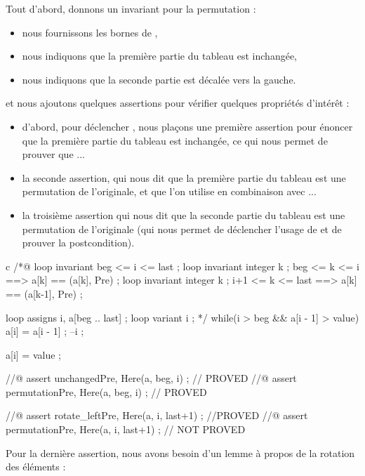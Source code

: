 Tout d'abord, donnons un invariant pour la permutation :

\begin{itemize}
    \item nous fournissons les bornes de ,
    \item nous indiquons que la première partie du tableau est inchangée,
    \item nous indiquons que la seconde partie est décalée vers la gauche.
\end{itemize}


et nous ajoutons quelques assertions pour vérifier quelques propriétés d'intérêt :
\begin{itemize}
    \item d'abord, pour déclencher , nous
          plaçons une première assertion pour énoncer que la première partie
          du tableau est inchangée, ce qui nous permet de prouver que ...
    \item la seconde assertion, qui nous dit que la première partie du tableau
          est une permutation de l'originale, et que l'on utilise en combinaison
          avec ...
    \item la troisième assertion qui nous dit que la seconde partie du tableau
          est une permutation de l'originale (qui nous permet de déclencher
          l'usage de  et de prouver la postcondition).
\end{itemize}


\begin{CodeBlock}{c}
  /*@
    loop invariant beg <= i <= last ;
    loop invariant \forall integer k ; beg <= k <= i    ==> a[k] == \at(a[k], Pre) ;
    loop invariant \forall integer k ; i+1 <= k <= last ==> a[k] == \at(a[k-1], Pre) ;

    loop assigns i, a[beg .. last] ;
    loop variant i ;
  */
  while(i > beg && a[i - 1] > value){
    a[i] = a[i - 1] ;
    --i ;
  }

  a[i] = value ;

  //@ assert unchanged{Pre, Here}(a, beg, i) ;   // PROVED
  //@ assert permutation{Pre, Here}(a, beg, i) ; // PROVED

  //@ assert rotate_left{Pre, Here}(a, i, last+1) ; //PROVED
  //@ assert permutation{Pre, Here}(a, i, last+1) ; // NOT PROVED
\end{CodeBlock}


Pour la dernière assertion, nous avons besoin d'un lemme à propos de la
rotation des éléments :


